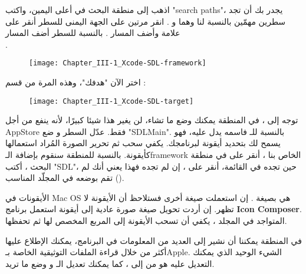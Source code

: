 اذهب إلى منطقة البحث في أعلى اليمين، واكتب
"\textenglish{search paths}"،
يجدر بك أن تجد سطرين مهمّين بالنسبة لنا وهما
و 
.
انقر مرتين على الجهة اليمنى للسطر 
أنقر على علامة
\InlineCode{+}
 وأضف المسار
.
بالنسبة للسطر 
أضف المسار\\
.

\begin{figure}[H]
	\centering
	\texttt{[image: Chapter\_III-1\_Xcode-SDL-framework]}
\end{figure}

اختر الآن "هدفك"، وهذه المرة من قسم 
:

\begin{figure}[H]
	\centering
	\texttt{[image: Chapter\_III-1\_Xcode-SDL-target]}
\end{figure}

توجه إلى 
،
في المنطقة
يمكنك وضع ما تشاء، لن يغير هذا شيئا كبيرًا، لأنه ينفع من أجل \textenglish{AppStore}
فقط. عدّل السطر 
و ضع 
"\textenglish{SDLMain}".
بالنسبة للـ
فاسمه يدل عليه، فهو يسمح لك بتحديد أيقونة لبرنامجك. يكفي سحب ثم تحرير الصورة المُراد استعمالها كأيقونة. بالنسبة للمنطقة 
سنقوم بإضافة الـ\textenglish{framework}
الخاص بنا
،
أنقر على
\InlineCode{+}
في منطقة البحث ، أكتب 
"\textenglish{SDL}"،
حين تجده في القائمة، أنقر على 
،
إن لم تجده فهذا يعني أنك لم تقم بوضعه في المجلّد المناسب 
().

\begin{information}
الأيقونات في
\textenglish{Mac OS}
هي بصيغة
.
إن استعملت صيغة أخرى فستلاحظ أن الأيقونة لا تظهر. إن أردت تحويل صيغة صورة عادية إلى أيقونة استعمل برنامج 
\textbf{\textenglish{Icon Composer}}.
المتواجد في المجلد
،
يكفي أن تسحب الأيقونة إلى المربع المخصص لها ثم تحفظها.
\end{information}

في المنطقة 
يمكننا أن نشير إلى العديد من المعلومات في البرنامج، يمكنك الإطلاع عليها أكثر من خلال قراءة الملفات التوثيقية الخاصة بـ\textenglish{Apple}.
الشيء الوحيد الذي يمكنك التعديل عليه هو 
من 
إلى 
،
كما يمكنك تعديل الـ
و وضع ما تريد.


